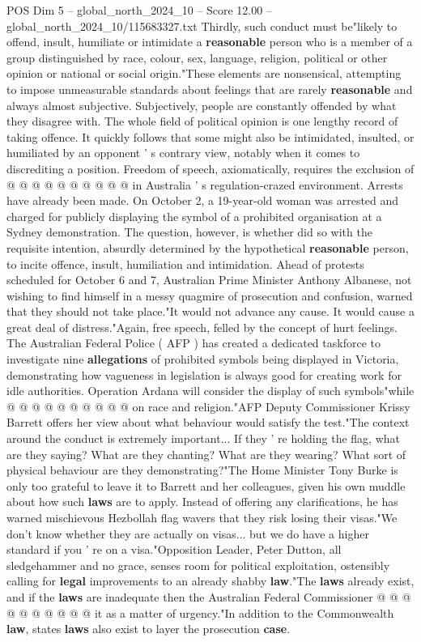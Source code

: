 \begin{textsample}{POS Dim 5 – global\_north\_2024\_10 – Score 12.00 – global\_north\_2024\_10/115683327.txt}
Thirdly, such conduct must be"likely to offend, insult, humiliate or intimidate a \textbf{reasonable} person who is a member of a group distinguished by race, colour, sex, language, religion, political or other opinion or national or social origin."These elements are nonsensical, attempting to impose unmeasurable standards about feelings that are rarely \textbf{reasonable} and always almost subjective.
Subjectively, people are constantly offended by what they disagree with.
The whole field of political opinion is one lengthy record of taking offence.
It quickly follows that some might also be intimidated, insulted, or humiliated by an opponent ' s contrary view, notably when it comes to discrediting a position.
Freedom of speech, axiomatically, requires the exclusion of @ @ @ @ @ @ @ @ @ @ in Australia ' s regulation-crazed environment.
Arrests have already been made.
On October 2, a 19-year-old woman was arrested and charged for publicly displaying the symbol of a prohibited organisation at a Sydney demonstration.
The question, however, is whether did so with the requisite intention, absurdly determined by the hypothetical \textbf{reasonable} person, to incite offence, insult, humiliation and intimidation.
Ahead of protests scheduled for October 6 and 7, Australian Prime Minister Anthony Albanese, not wishing to find himself in a messy quagmire of prosecution and confusion, warned that they should not take place."It would not advance any cause.
It would cause a great deal of distress."Again, free speech, felled by the concept of hurt feelings.
The Australian Federal Police ( AFP ) has created a dedicated taskforce to investigate nine \textbf{allegations} of prohibited symbols being displayed in Victoria, demonstrating how vagueness in legislation is always good for creating work for idle authorities.
Operation Ardana will consider the display of such symbols"while @ @ @ @ @ @ @ @ @ @ on race and religion."AFP Deputy Commissioner Krissy Barrett offers her view about what behaviour would satisfy the test."The context around the conduct is extremely important...
If they ' re holding the flag, what are they saying?
What are they chanting?
What are they wearing?
What sort of physical behaviour are they demonstrating?"The Home Minister Tony Burke is only too grateful to leave it to Barrett and her colleagues, given his own muddle about how such \textbf{laws} are to apply.
Instead of offering any clarifications, he has warned mischievous Hezbollah flag wavers that they risk losing their visas."We don't know whether they are actually on visas... but we do have a higher standard if you ' re on a visa."Opposition Leader, Peter Dutton, all sledgehammer and no grace, senses room for political exploitation, ostensibly calling for \textbf{legal} improvements to an already shabby \textbf{law}."The \textbf{laws} already exist, and if the \textbf{laws} are inadequate then the Australian Federal Commissioner @ @ @ @ @ @ @ @ @ @ it as a matter of urgency."In addition to the Commonwealth \textbf{law}, states \textbf{laws} also exist to layer the prosecution \textbf{case}.

\end{textsample}
